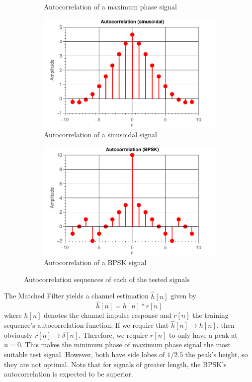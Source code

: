 \documentclass[11pt,titlepage]{report}
\begin{document}
\begin{figure}[H]
\begin{subfigure}{0.49\textwidth}
		\caption{Autocorrelation of a maximum phase signal}
	\end{subfigure}
	\begin{subfigure}{0.49\textwidth}
		\includegraphics[width=\textwidth]{../../deliverable-7-resources/figures/ass-1/report-8-9-10/report-8/ass-1-report-8-sinusoidal-sinusoidal.pdf}
		\caption{Autocorrelation of a sinusoidal signal}
	\end{subfigure}
	\begin{subfigure}{0.49\textwidth}
		\includegraphics[width=\textwidth]{../../deliverable-7-resources/figures/ass-1/report-8-9-10/report-8/ass-1-report-8-BPSK-BPSK.pdf}
		\caption{Autocorrelation of a BPSK signal}
	\end{subfigure}
	\caption{Autocorrelation sequences of each of the tested signals}
	\label{fig:ass-1-rep-8}
\end{figure}

The Matched Filter yields a channel estimation $\hat{h}[n]$ given by
\[
	\hat{h}[n] = h[n] \ast r[n]
\]
where $h[n]$ denotes the channel impulse response and $r[n]$ the training sequence's autocorrelation function. If we require that $\hat{h}[n] \rightarrow h[n]$, then obviously $r[n] \rightarrow \delta[n]$. Therefore, we require $r[n]$ to only have a peak at $n=0$. This makes the minimum phase of maximum phase signal the most suitable test signal. However, both have side lobes of $1/2.5$ the peak's height, so they are not optimal. Note that for signals of greater length, the BPSK's autocorrelation is expected to be superior.
 
\end{document}
